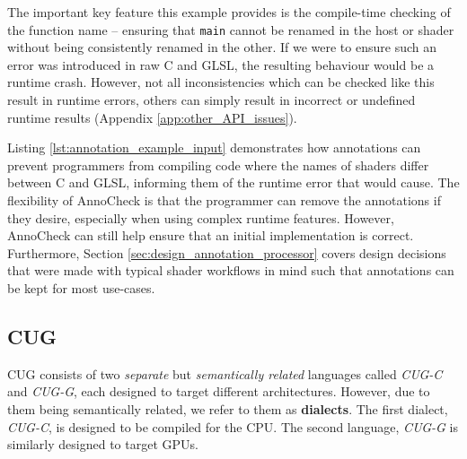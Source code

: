 \documentclass[a4paper,12pt,twoside,openright]{report}
\begin{document}

The important key feature this example provides is the compile-time checking of
the function name -- ensuring that \texttt{main} cannot be renamed in the host
or shader without being consistently renamed in the other. If we were to ensure
such an error was introduced in raw C and GLSL, the resulting behaviour would
be a runtime crash. However, not all inconsistencies which can be checked like
this result in runtime errors, others can simply result in incorrect or
undefined runtime results (Appendix \ref{app:other_API_issues}).

Listing \ref{lst:annotation_example_input} demonstrates how annotations can
prevent programmers from compiling code where the names of shaders differ
between C and GLSL, informing them of the runtime error that would cause. The
flexibility of AnnoCheck is that the programmer can remove the annotations if
they desire, especially when using complex runtime features. However, AnnoCheck
can still help ensure that an initial implementation is correct. Furthermore,
Section \ref{sec:design_annotation_processor} covers design decisions that were
made with typical shader workflows in mind such that annotations can be kept
for most use-cases.

\subsection{CUG}

CUG consists of two \textit{separate} but \textit{semantically related}
languages called \textit{CUG-C} and \textit{CUG-G}, each designed to target
different architectures. However, due to them being semantically related, we
refer to them as \textbf{dialects}. The first dialect, \textit{CUG-C}, is
designed to be compiled for the CPU. The second language, \textit{CUG-G} is
similarly designed to target GPUs.

\end{document}
